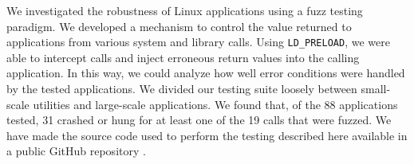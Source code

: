 We investigated the robustness of Linux applications using a fuzz testing paradigm. We developed a mechanism to control the value returned to applications from various system and library calls. Using \texttt{LD\_PRELOAD}, we were able to intercept calls and inject erroneous return values into the calling application. In this way, we could analyze how well error conditions were handled by the tested applications. We divided our testing suite loosely between small-scale utilities and large-scale applications. We found that, of the 88 applications tested, 31 crashed or hung for at least one of the 19 calls that were fuzzed. We have made the source code used to perform the testing described here available in a public GitHub repository \cite{github}.

